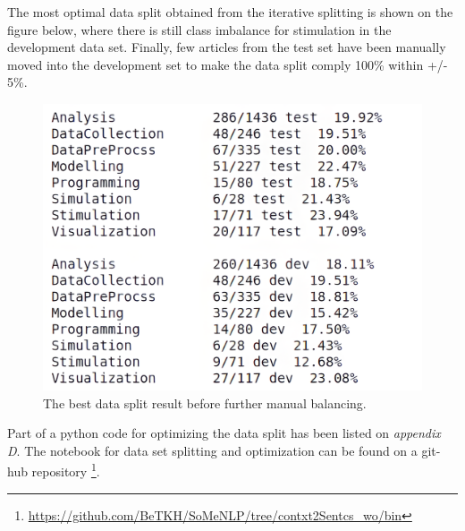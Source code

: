 The most optimal data split obtained from the iterative splitting is shown on the figure below, where there is still class imbalance for stimulation in the development data set. Finally, few articles from the test set have been manually moved into the development set to make the data split comply 100\% within +/- 5\%. \\

\begin{figure}[htbp]
	\centering
	\includegraphics[width=.54\textwidth]{4.graphics/figures/ch_6/optimal_split_sofar}
	\caption{The best data split result before further manual balancing.}
	\label{fig:chapter04:setup}
\end{figure}

Part of a python code for optimizing the data split has been listed on \emph{appendix D}. The notebook for data set splitting and optimization can be found on a git-hub repository  \footnote{\url{https://github.com/BeTKH/SoMeNLP/tree/contxt2Sentcs_wo/bin}}. 


